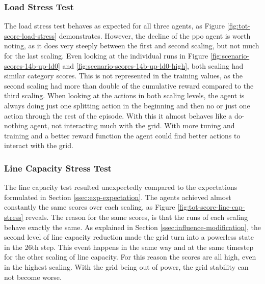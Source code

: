 \subsubsection{Load Stress Test}
The load stress test behaves as expected for all three agents, as Figure \ref{fig:tot-score-load-stress} demonstrates. However, the decline of the \ac{ppo} agent is worth noting, as it does very steeply between the first and second scaling, but not much for the last scaling. Even looking at the individual runs in Figure \ref{fig:scenario-scores-14b-up-ld0} and \ref{fig:scenario-scores-14b-up-ld0-high}, both scaling had similar category scores. This is not represented in the training values, as the second scaling had more than double of the cumulative reward compared to the third scaling. When looking at the actions in both scaling levels, the agent is always doing just one splitting action in the beginning and then no or just one action through the rest of the episode. With this it almost behaves like a do-nothing agent, not interacting much with the grid. With more tuning and training and a better reward function the agent could find better actions to interact with the grid.

\subsubsection{Line Capacity Stress Test}
The line capacity test resulted unexpectedly compared to the expectations formulated in Section \ref{ssec:exp-expectation}. The agents achieved almost constantly the same scores over each scaling, as Figure \ref{fig:tot-score-line-cap-stress} reveals. The reason for the same scores, is that the runs of each scaling behave exactly the same. As explained in Section \ref{ssec:influence-modification}, the second level of line capacity reduction made the grid turn into a powerless state in the 26th step. This event happens in the same way and at the same timestep for the other scaling of line capacity. For this reason the scores are all high, even in the highest scaling. With the grid being out of power, the grid stability can not become worse.

